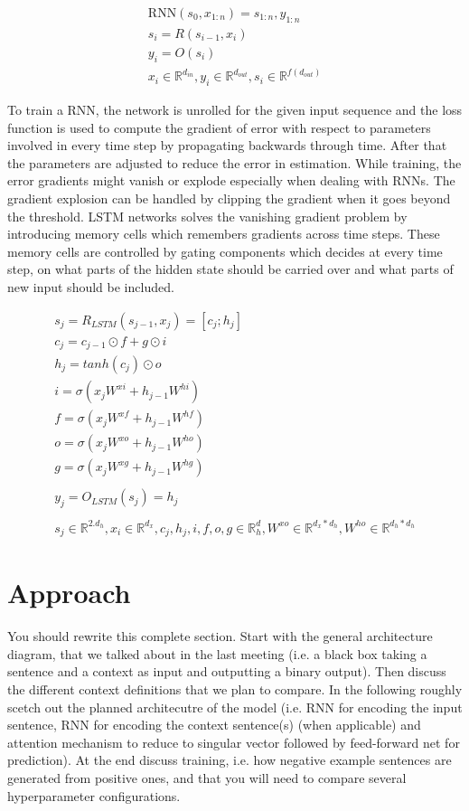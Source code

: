 \documentclass[a4paper, 11pt]{article}
\newcommand{\R}{\mathbb{R}}
\begin{document}
\begin{align*}
\mathrm{RNN}(s_0,x_{1:n}) = s_{1:n}, y_{1:n} \\
s_i = R(s_{i-1},x_i) \\
y_i = O(s_i) \\
x_i \in \R^{d_{in}}, y_i \in \R^{d_{out}}, s_i \in \R^{f(d_{out})} 
\end{align*}

To train a RNN, the network is unrolled for the given input sequence and the loss function is used to compute the gradient of error with respect to parameters involved in every time step by propagating backwards through time. After that the parameters are adjusted to reduce the error in estimation\cite{Werbos1990}. While training, the error gradients might vanish or explode especially when dealing with RNNs. The gradient explosion can be handled by clipping the gradient when it goes beyond the threshold. LSTM networks \cite{Hochreiter1997} solves the vanishing gradient problem by introducing memory cells which remembers gradients across time steps. These memory cells are controlled by gating components which decides at every time step, on what parts of the hidden state should be carried over and what parts of new input should be included. 

\begin{align*}
s_j = R_{LSTM}(s_{j-1},x_j) = [c_j;h_j] \\
c_j = c_{j-1} \odot f + g \odot i \\
h_j = tanh(c_j) \odot o \\
i = \sigma(x_jW^{xi} + h_{j-1} W^{hi}) \\
f = \sigma(x_jW^{xf} + h_{j-1} W^{hf}) \\
o = \sigma(x_jW^{xo} + h_{j-1} W^{ho}) \\
g = \sigma(x_jW^{xg} + h_{j-1} W^{hg}) \\
\\
y_j = O_{LSTM}(s_j) = h_j \\
\\
s_j \in \R^{2.d_h},   x_i \in \R^{d_x},  c_j,h_j,i,f,o,g \in \R^d_h,  W^{xo} \in \R^{d_x*d_h},  W^{ho} \in \R^{d_h*d_h}
\end{align*}

\section{Approach} 

You should rewrite this complete section. Start with the general architecture diagram, that we talked about in the last meeting (i.e. a black box taking a sentence and a context as input and outputting a binary output). Then discuss the different  context definitions that we plan to compare. In the following roughly scetch out the planned architecutre of the model (i.e. RNN for encoding the input sentence, RNN for encoding the context sentence(s) (when applicable) and attention mechanism to reduce to singular vector followed by feed-forward net for prediction). At the end discuss training, i.e. how negative example sentences are generated from positive ones, and that you will need to compare several hyperparameter configurations.
\end{document}
